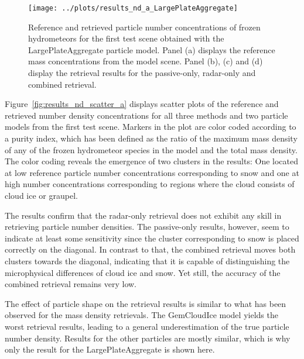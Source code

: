 \documentclass[journal abbreviation, manuscript]{copernicus}
\begin{document}
\begin{figure}
\centering
\texttt{[image: ../plots/results\_nd\_a\_LargePlateAggregate]}
\caption{Reference and retrieved particle number concentrations of frozen
  hydrometeors for the first test scene obtained with the LargePlateAggregate
  particle model. Panel (a) displays the reference mass concentrations from the
  model scene. Panel (b), (c) and (d) display the retrieval results for the
  passive-only, radar-only and combined retrieval.}
\label{fig:results_nd_a}
\end{figure}

Figure~\ref{fig:results_nd_scatter_a} displays scatter plots of the reference
and retrieved number density concentrations for all three methods and two
particle models from the first test scene. Markers in the plot are color coded
according to a purity index, which has been defined as the ratio of the maximum
mass density of any of the frozen hydrometeor species in the model and the total
mass density. The color coding reveals the emergence of two clusters in the
results: One located at low reference particle number concentrations
corresponding to snow and one at high number concentrations corresponding to
regions where the cloud consists of cloud ice or graupel.

The results confirm that the radar-only retrieval does not exhibit any skill in
retrieving particle number densities. The passive-only results, however, seem to
indicate at least some sensitivity since the cluster corresponding to snow is
placed correctly on the diagonal. In contrast to that, the combined retrieval
moves both clusters towards the diagonal, indicating that it is capable of
distinguishing the microphysical differences of cloud ice and snow. Yet still,
the accuracy of the combined retrieval remains very low.

The effect of particle shape on the retrieval results is similar to what has
been observed for the mass density retrievals. The GemCloudIce model yields the
worst retrieval results, leading to a general underestimation of the true
particle number density. Results for the other particles are mostly similar,
which is why only the result for the LargePlateAggregate is shown here.
\end{document}

